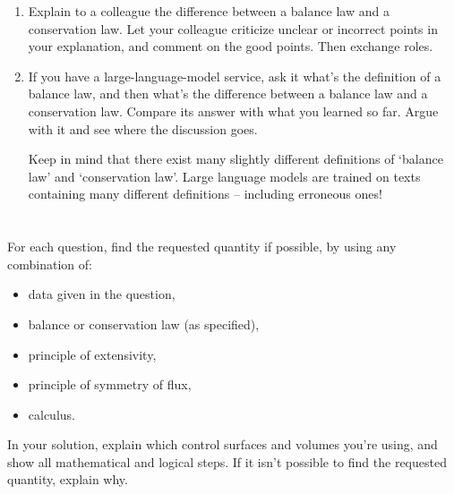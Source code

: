 \documentclass[a4paper,12pt,%
onecolumn,oneside,%
british%
]{memoir}
\renewcommand*{\|}[1][]{\nonscript\:#1\vert\nonscript\:\mathopen{}}
\begin{document}
\smallskip

\begin{enumerate}[exerc]
\item Explain to a colleague the difference between a balance law and a conservation law. Let your colleague criticize unclear or incorrect points in your explanation, and comment on the good points. Then exchange roles.
\item If you have a large-language-model service, ask it what's the definition of a balance law, and then what's the difference between a balance law and a conservation law. Compare its answer with what you learned so far. Argue with it and see where the discussion goes.\nopagebreak

  Keep in mind that there exist many slightly different definitions of \enquote*{balance law} and \enquote*{conservation law}.  Large language models are trained on texts containing many different definitions -- including erroneous ones!
\end{enumerate}


\section{}
\label{sec:calc_from_bal}

For each question, find the requested quantity if possible, by using any combination of:
\begin{itemize}[nosep]
\item data given in the question,
\item balance or conservation law (as specified),
\item principle of extensivity,
\item principle of symmetry of flux,
\item calculus.
\end{itemize}
In your solution, explain which control surfaces and volumes you're using, and show all mathematical and logical steps. If it isn't possible to find the requested quantity, explain why.
\end{document}
